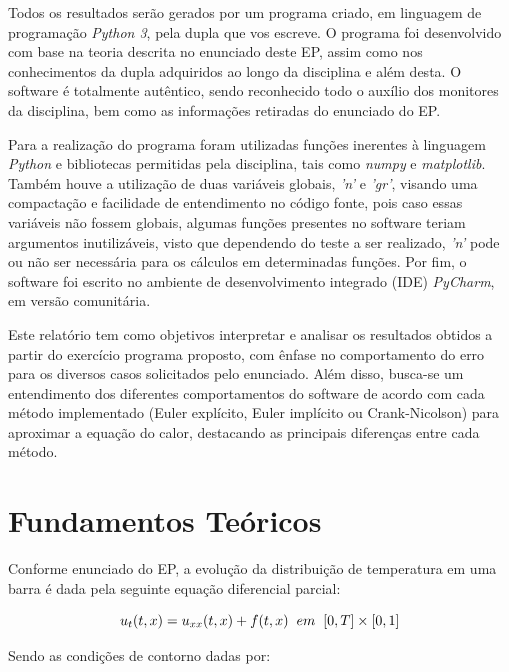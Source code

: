 \documentclass[a4paper, 12pt]{article}
\begin{document}
Todos os resultados serão gerados por um programa criado, em linguagem de programação \textit{Python 3}, pela dupla que vos escreve. O programa foi desenvolvido com base na teoria descrita no enunciado deste EP, assim como nos conhecimentos da dupla adquiridos ao longo da disciplina e além desta. O software é totalmente autêntico, sendo reconhecido todo o auxílio dos monitores da disciplina, bem como as informações retiradas do enunciado do EP. 

Para a realização do programa foram utilizadas funções inerentes à linguagem \textit{Python} e bibliotecas permitidas pela disciplina, tais como \textit{numpy} e \textit{matplotlib}. Também houve a utilização de duas variáveis globais, \textit{'n'} e \textit{'gr'}, visando uma compactação e facilidade de entendimento no código fonte, pois caso essas variáveis não fossem globais, algumas funções presentes no software teriam argumentos inutilizáveis, visto que dependendo do teste a ser realizado, \textit{'n'} pode ou não ser necessária para os cálculos em determinadas funções. Por fim, o software foi escrito no ambiente de desenvolvimento integrado (IDE) \textit{PyCharm}, em versão comunitária. 

Este relatório tem como objetivos interpretar e analisar os resultados obtidos a partir do exercício programa proposto, com ênfase no comportamento do erro para os diversos casos solicitados pelo enunciado. Além disso, busca-se um entendimento dos diferentes comportamentos do software de acordo com cada método implementado (Euler explícito, Euler implícito ou Crank-Nicolson) para aproximar a equação do calor, destacando as principais diferenças entre cada método.




\section{Fundamentos Teóricos}

Conforme enunciado do EP, a evolução da distribuição de temperatura em uma barra é dada pela seguinte equação diferencial parcial:

\begin{equation}u_{t}(t,x)=u_{xx}(t,x)+f(t,x) \hspace{0.2cm}em\hspace{0.2cm} [0,T] \times [0,1]\end{equation}

Sendo as condições de contorno dadas por:
\end{document}
